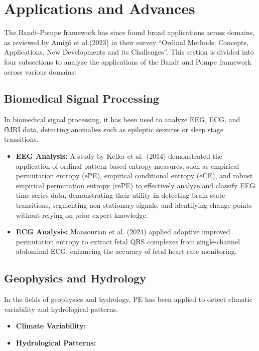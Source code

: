 \section{Applications and Advances}
The Bandt-Pompe framework has since found broad applications across domains, as reviewed by Amigó et al.(2023) in their survey “Ordinal Methods: Concepts, Applications, New Developments and its Challenges”\cite{amigo2023ordinal}. This section is divided into four subsections to analyze the applications of the Bandt and Pompe framework across various domains:

\subsection{Biomedical Signal Processing}
In biomedical signal processing, it has been used to analyze EEG, ECG, and fMRI data, detecting anomalies such as epileptic seizures or sleep stage transitions. 
\begin{itemize}
	\item \textbf{EEG Analysis:} A study by Keller et al.~(2014)\cite{Keller2014} demonstrated the application of ordinal pattern based entropy measures, such as empirical permutation entropy (ePE), empirical conditional entropy (eCE), and robust empirical permutation entropy (rePE) to effectively analyze and classify EEG time series data, demonstrating their utility in detecting brain state transitions, segmenting non-stationary signals, and identifying change-points without relying on prior expert knowledge.
	
	\item \textbf{ECG Analysis:} Mansourian et al. (2024)\cite{Mansourian2024} applied adaptive improved permutation entropy to extract fetal QRS complexes from single-channel abdominal ECG, enhancing the accuracy of fetal heart rate monitoring.
\end{itemize}

\subsection{Geophysics and Hydrology}
In the fields of geophysics and hydrology, PE has been applied to detect climatic variability and hydrological patterns.
\begin{itemize}
	\item \textbf{Climate Variability:}
	
	\item \textbf{Hydrological Patterns:}
\end{itemize}

